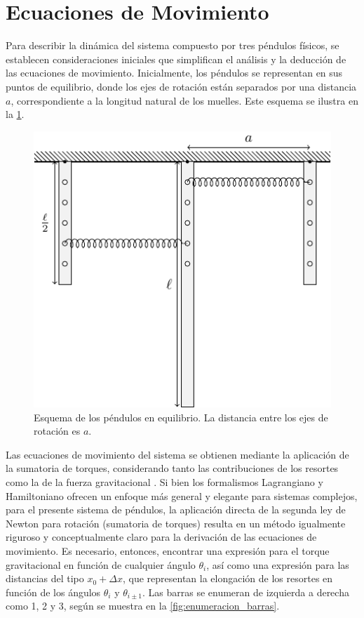 \section{Ecuaciones de Movimiento}

Para describir la din\'amica del sistema compuesto por tres p\'endulos
f\'isicos, se establecen consideraciones iniciales que simplifican el
an\'alisis y la deducci\'on de las ecuaciones de movimiento.
Inicialmente, los p\'endulos se representan en sus puntos de
equilibrio, donde los ejes de rotaci\'on est\'an separados por una
distancia $a$, correspondiente a la longitud natural de los muelles.
Este esquema se ilustra en la \cref{fig:esquema_equilibrio}.

\begin{figure}[htbp!]
  \centering
  \includegraphics[width=0.8\linewidth]{./Figures/system-diagram.pdf}
  \caption{Esquema de los p\'endulos en equilibrio. La distancia
  entre los ejes de rotaci\'on es $a$.}
  \label{fig:esquema_equilibrio}
\end{figure}

Las ecuaciones de movimiento del sistema se obtienen mediante la
aplicaci\'on de la sumatoria de torques, considerando tanto las
contribuciones de los resortes como la de la fuerza gravitacional
. Si bien los formalismos Lagrangiano y Hamiltoniano
ofrecen un enfoque m\'as general y elegante para sistemas complejos,
para el presente sistema de p\'endulos, la aplicaci\'on directa de
la segunda ley de Newton para rotaci\'on (sumatoria de torques)
resulta en un m\'etodo igualmente riguroso y conceptualmente claro
para la derivaci\'on de las ecuaciones de movimiento.
Es necesario, entonces, encontrar una expresi\'on para el torque
gravitacional en funci\'on de cualquier \'angulo $\theta_i$, as\'i
como una expresi\'on para las distancias del tipo $x_0 + \Delta x$,
que representan la elongaci\'on de los resortes en funci\'on de los
\'angulos $\theta_i$ y $\theta_{i\pm 1}$. Las barras se
enumeran de izquierda a derecha como 1, 2 y 3, seg\'un se muestra en la
\cref{fig:enumeracion_barras}.

